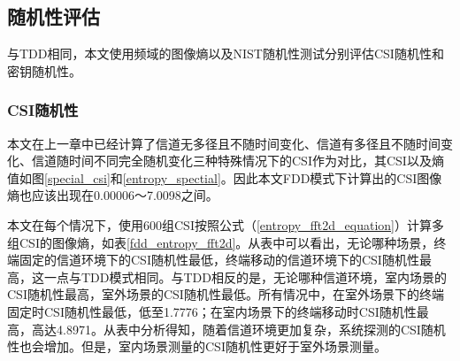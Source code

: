 \documentclass[master]{seuthesis} %
\begin{document}
\begin{Main}
\begin{table}[]
    \centering
    \caption{室内、走廊和室外三种场景的平均安全信息率
    \label{fdd_three_scene_avg}}
\end{table}

\begin{table}[]
    \centering
    \caption{终端固定、人员走动和终端移动三种信道环境的平均安全信息率
    \label{fdd_three_channel_env_avg}}
\end{table}

\subsection{随机性评估}

与TDD相同，本文使用频域的图像熵以及NIST随机性测试分别评估CSI随机性和密钥随机性。

\subsubsection{CSI随机性}

本文在上一章中已经计算了信道无多径且不随时间变化、信道有多径且不随时间变化、信道随时间不同完全随机变化三种特殊情况下的CSI作为对比，其CSI以及熵值如图\ref{special_csi}和\ref{entropy_spectial}。因此本文FDD模式下计算出的CSI图像熵也应该出现在0.00006～7.0098之间。

本文在每个情况下，使用600组CSI按照公式（\ref{entropy_fft2d_equation}）计算多组CSI的图像熵，如表\ref{fdd_entropy_fft2d}。从表中可以看出，无论哪种场景，终端固定的信道环境下的CSI随机性最低，终端移动的信道环境下的CSI随机性最高，这一点与TDD模式相同。与TDD相反的是，无论哪种信道环境，室内场景的CSI随机性最高，室外场景的CSI随机性最低。所有情况中，在室外场景下的终端固定时CSI随机性最低，低至1.7776；在室内场景下的终端移动时CSI随机性最高，高达4.8971。从表中分析得知，随着信道环境更加复杂，系统探测的CSI随机性也会增加。但是，室内场景测量的CSI随机性更好于室外场景测量。


\end{Main}
\end{document}
